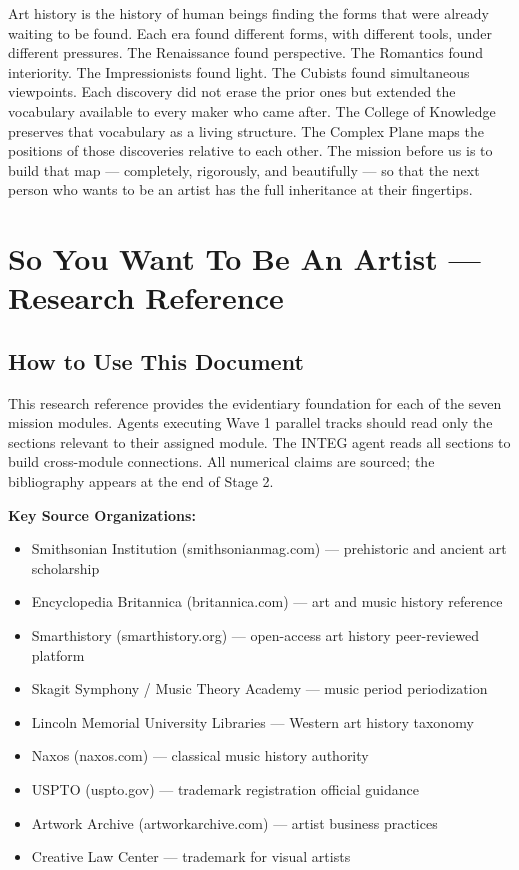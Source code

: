 \documentclass[11pt,letterpaper]{article}
\newcommand{\stageheader}[2]{%
  \noindent\colorbox{#2}{\makebox[\textwidth][l]{%
    \textcolor{white}{\bfseries\sffamily\hspace{6pt}#1\hspace{6pt}}}}%
  \vspace{0.5em}\par%
}
\begin{document}
Art history is the history of human beings finding the forms that were already waiting to be found. Each era found different forms, with different tools, under different pressures. The Renaissance found perspective. The Romantics found interiority. The Impressionists found light. The Cubists found simultaneous viewpoints. Each discovery did not erase the prior ones but extended the vocabulary available to every maker who came after. The College of Knowledge preserves that vocabulary as a living structure. The Complex Plane maps the positions of those discoveries relative to each other. The mission before us is to build that map --- completely, rigorously, and beautifully --- so that the next person who wants to be an artist has the full inheritance at their fingertips.

\newpage
\stageheader{STAGE 2 --- RESEARCH REFERENCE}{secondary}

\section{So You Want To Be An Artist --- Research Reference}

\subsection{How to Use This Document}

This research reference provides the evidentiary foundation for each of the seven mission modules. Agents executing Wave 1 parallel tracks should read only the sections relevant to their assigned module. The INTEG agent reads all sections to build cross-module connections. All numerical claims are sourced; the bibliography appears at the end of Stage 2.

\textbf{Key Source Organizations:}
\begin{itemize}[noitemsep]
  \item Smithsonian Institution (smithsonianmag.com) --- prehistoric and ancient art scholarship
  \item Encyclopedia Britannica (britannica.com) --- art and music history reference
  \item Smarthistory (smarthistory.org) --- open-access art history peer-reviewed platform
  \item Skagit Symphony / Music Theory Academy --- music period periodization
  \item Lincoln Memorial University Libraries --- Western art history taxonomy
  \item Naxos (naxos.com) --- classical music history authority
  \item USPTO (uspto.gov) --- trademark registration official guidance
  \item Artwork Archive (artworkarchive.com) --- artist business practices
  \item Creative Law Center --- trademark for visual artists
\end{itemize}
\end{document}
